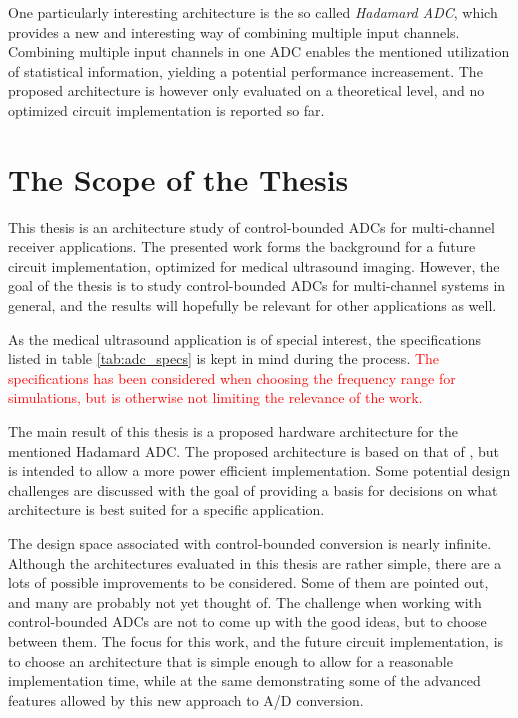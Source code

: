 One particularly interesting architecture is the so called \textit{Hadamard ADC}, which provides a new and interesting way of combining multiple input channels. Combining multiple input channels in one ADC enables the mentioned utilization of statistical information, yielding a potential performance increasement. The proposed architecture is however only evaluated on a theoretical level, and no optimized circuit implementation is reported so far.

\section{The Scope of the Thesis}
This thesis is an architecture study of control-bounded ADCs for multi-channel receiver applications. The presented work forms the background for a future circuit implementation, optimized for medical ultrasound imaging. However, the goal of the thesis is to study control-bounded ADCs for multi-channel systems in general, and the results will hopefully be relevant for other applications as well.

As the medical ultrasound application is of special interest, the  specifications listed in table \ref{tab:adc_specs} is kept in mind during the process. \textcolor{red}{The specifications has been considered when choosing the frequency range for simulations, but is otherwise not limiting the relevance of the work.}


The main result of this thesis is a proposed hardware architecture for the mentioned Hadamard ADC. The proposed architecture is based on that of \cite{malmberg_thesis}, but is intended to allow a more power efficient implementation. Some potential design challenges are discussed with the goal of providing a basis for decisions on what architecture is best suited for a specific application.

The design space associated with control-bounded conversion is nearly infinite. Although the architectures evaluated in this thesis are rather simple, there are a lots of possible improvements to be considered. Some of them are pointed out, and many are probably not yet thought of. The challenge when working with control-bounded ADCs are not to come up with the good ideas, but to choose between them. The focus for this work, and the future circuit implementation, is to choose an architecture that is simple enough to allow for a reasonable implementation time, while at the same demonstrating some of the advanced features allowed by this new approach to A/D conversion.



